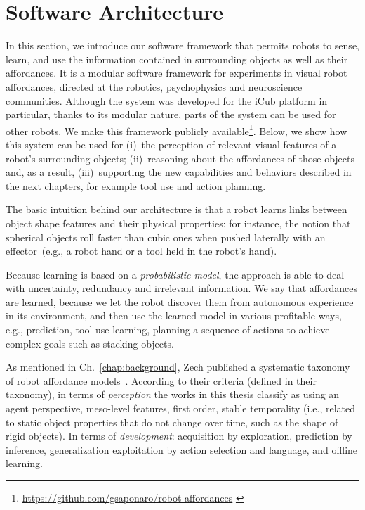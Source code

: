 \section{Software Architecture}
\label{sec:platform:software_architecture}

In this section, we introduce our software framework that permits robots to sense, learn, and use the information contained in surrounding objects as well as their affordances.
It is a modular software framework for experiments in visual robot affordances, directed at the robotics, psychophysics and neuroscience communities.
Although the system was developed for the iCub platform in particular, thanks to its modular nature, parts of the system can be used for other robots.
We make this framework publicly available\footnote{\url{https://github.com/gsaponaro/robot-affordances} \label{footnote:robot-affordances_url}}.
Below, we show how this system can be used for
(i)~the perception of relevant visual features of a robot's surrounding objects;
(ii)~reasoning about the affordances of those objects and, as a result,
(iii)~supporting the new capabilities and behaviors described in the next chapters, for example tool use and action planning.

The basic intuition behind our architecture is that a robot learns links between object shape features and their physical properties: for instance, the notion that spherical objects roll faster than cubic ones when pushed laterally with an effector~(e.g., a robot hand or a tool held in the robot's hand).

Because learning is based on a \emph{probabilistic model}, the approach is able to deal with uncertainty, redundancy and irrelevant information.
We say that affordances are learned, because we let the robot discover them from autonomous experience in its environment, and then use the learned model in various profitable ways, e.g., prediction, tool use learning, planning a sequence of actions to achieve complex goals such as stacking objects.

As mentioned in Ch.~\ref{chap:background}, Zech published a systematic taxonomy of robot affordance models~\cite{zech:2017:ab}.
According to their criteria (defined in their taxonomy),
in terms of \emph{perception} the works in this thesis classify as using an agent perspective, meso-level features, first order, stable temporality (i.e., related to static object properties that do not change over time, such as the shape of rigid objects).
In terms of \emph{development}: acquisition by exploration, prediction by inference, generalization exploitation by action selection and language, and offline learning.

